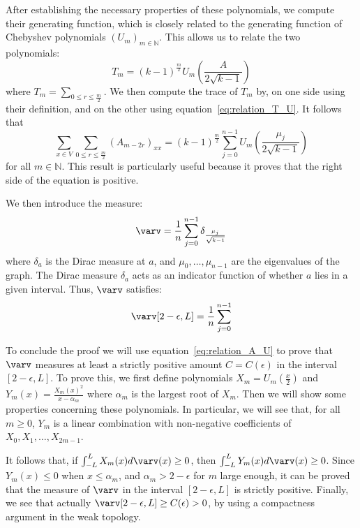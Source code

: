 \documentclass[11pt]{article}
\theoremstyle{definition}
\begin{document}
    After establishing the necessary properties of these polynomials, we compute their generating function, which is
    closely related to the generating function of Chebyshev polynomials $(U_m)_{m\in \mathbb{N}}$.
    This allows us to relate the two polynomials:
    \begin{equation}
        \label{eq:relation_T_U}
    T_m = (k-1)^{\frac{m}{2}} U_m\left(\frac{A}{2 \sqrt{k-1}}\right)
    \end{equation}
    where $T_m = \sum_{0 \leq r \leq \frac{m}{2}}$.
    We then compute the trace of $T_m$ by, on one side using their definition, and on the other using
    equation~\eqref{eq:relation_T_U}.
    It follows that
    \begin{equation}
        \label{eq:relation_A_U}
        \sum_{x \in V} \sum_{0\leq r \leq\frac{m}{2}} \left(A_{m-2r}\right)_{xx} = (k-1)^{\frac{m}{2}} \sum_{j=0}^{n-1} U_m\left(\frac{\mu_j}{2\sqrt{k-1}}\right)
    \end{equation}
    for all $m \in \mathbb{N}$.
    This result is particularly useful because it proves that the right side of the equation is positive.
    \newline

    We then introduce the measure:
    $$\varv = \frac{1}{n} \sum^{n-1}_{j=0} \delta_{\frac{\mu_j}{\sqrt{k-1}}}$$
    where $\delta_a$ is the Dirac measure at $a$, and $\mu_0, \dots, \mu_{n-1}$ are the eigenvalues of the graph.
    The Dirac measure $\delta_a$ acts as an indicator function of whether $a$ lies in a given interval.
    Thus, $\varv$ satisfies:
    $$
    \varv[2-\epsilon, L] = \frac{1}{n} \sum_{j=0}^{n-1}
    $$
    \newline

    To conclude the proof we will use equation~\ref{eq:relation_A_U} to prove that $\varv$ measures at least a strictly
    positive amount $C = C(\epsilon)$ in the interval $[2-\epsilon, L]$.
    To prove this, we first define polynomials $X_m = U_m(\frac{x}{2})$ and $Y_m(x) = \frac{X_m(x)^2}{x - \alpha_m}$ where
    $\alpha_m$ is the largest root of $X_m$.
    Then we will show some properties concerning these polynomials.
    In particular, we will see that, for all $m \geq 0$, $Y_m$ is a linear combination with non-negative coefficients
    of $X_0, X_1, \dots, X_{2m-1}$.
    \newline

    It follows that, if $\int_{-L}^{L} X_m(x) d \varv(x) \geq 0$, then $\int_{-L}^{L} Y_m(x) d \varv(x) \geq 0$.
    Since $Y_m(x) \leq 0$ when $x \leq \alpha_m$, and $\alpha_m > 2 - \epsilon$ for $m$ large enough,
    it can be proved that the measure of $\varv$ in the interval $[2-\epsilon, L]$ is strictly positive.
    Finally, we see that actually $\varv[2 - \epsilon, L] \geq C(\epsilon) > 0$, by using a compactness argument in the
    weak topology.
    \newline
\end{document}
